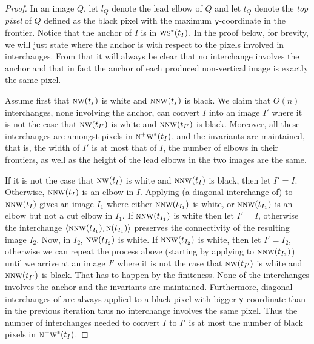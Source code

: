 \documentclass[lotsofwhite,charterfonts]{patmorin}
\newcommand{\N}{\textsc{n}}
\renewcommand{\S}{\textsc{s}}
\newcommand{\W}{\textsc{w}}
\newcommand{\NW}{\textsc{nw}}
\newcommand{\y}{\ensuremath{\protect\textup{\textsf{y}}}}
\newcommand{\ic}[2]{\langle #1,#2 \rangle}
\begin{document}
\begin{proof}

In an image $Q$, let $l_Q$ denote the lead elbow of $Q$ and let $t_Q$ denote the \emph{top pixel} of $Q$ defined as the black pixel with the maximum \y-coordinate in the frontier. Notice that the anchor of $I$ is in $\W\S^*(t_I)$. In the proof below, for brevity, we will just state where the anchor is with respect to the pixels involved in interchanges. From that it will always be clear that  no interchange involves the anchor and that in fact the anchor of each produced non-vertical image is exactly the same pixel.

Assume first that $\NW(t_I)$ is white and $\N\NW(t_I)$ is black. We claim that $O(n)$ interchanges, none involving the anchor, can convert $I$ into an image $I'$ where it is not the case that $\NW(t_{I'})$ is white and $\N\NW(t_{I'})$ is black. Moreover, all these interchanges are amongst pixels in $\N^+\W^*(t_I)$, and the invariants are maintained, that is, the width of $I'$ is at most that of $I$, the number of elbows in their frontiers, as well as the height of the lead elbows in the two images are the same. 

If it is not the case that $\NW(t_I)$ is white and $\N\NW(t_I)$ is black, then let $I'=I$. Otherwise, $\N\NW(t_I)$ is an elbow in $I$. Applying (a diagonal interchange of)  to $\N\NW(t_I)$ gives an image $I_1$ where either $\N\NW(t_{I_1})$ is white, or $\N\NW(t_{I_1})$ is an elbow but not a cut elbow in $I_1$. If $\N\NW(t_{I_1})$ is white then let $I'=I$, otherwise the interchange $\ic{\N\NW(t_{I_1})}{\N(t_{I_1})}$ preserves the connectivity of the resulting image $I_2$. Now, in $I_2$, $\NW(t_{I_2})$ is white. If $\N\NW(t_{I_2})$ is white, then let $I'=I_2$, otherwise we can repeat the process above (starting by applying  to $\N\NW(t_{I_2})$) until we arrive at an image $I'$ where it is not the case that $\NW(t_{I'})$ is white and $\N\NW(t_{I'})$ is black. That has to happen by the finiteness. None of the interchanges involves the anchor and the invariants are maintained. Furthermore, diagonal interchanges of  are always applied to a black pixel with bigger \y-coordinate than in the previous iteration thus no interchange involves the same pixel. Thus the number of interchanges needed to convert $I$ to $I'$ is at most the number of black pixels in $\N^+\W^*(t_I)$.



\end{proof}
\end{document}

